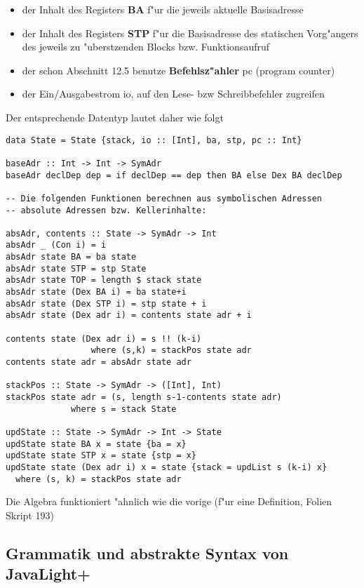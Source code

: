 \documentclass[11pt]{article}
\begin{document}
\begin{itemize}
\item der Inhalt des Registers \textbf{BA} f"ur die jeweils aktuelle Basisadresse
\item der Inhalt des Registers \textbf{STP} f"ur die Basisadresse des statischen Vorg"angers des jeweils zu "uberstzenden Blocks bzw. Funktionsaufruf
\item der schon Abschnitt 12.5 benutze \textbf{Befehlsz"ahler} pc (program counter)
\item der Ein/Ausgabestrom io, auf den Lese- bzw Schreibbefehler zugreifen
\end{itemize}

Der entsprechende Datentyp lautet daher wie folgt

\begin{verbatim}
data State = State {stack, io :: [Int], ba, stp, pc :: Int}

baseAdr :: Int -> Int -> SymAdr
baseAdr declDep dep = if declDep == dep then BA else Dex BA declDep

-- Die folgenden Funktionen berechnen aus symbolischen Adressen
-- absolute Adressen bzw. Kellerinhalte:

absAdr, contents :: State -> SymAdr -> Int
absAdr _ (Con i) = i
absAdr state BA = ba state
absAdr state STP = stp State
absAdr state TOP = length $ stack state
absAdr state (Dex BA i) = ba state+i
absAdr state (Dex STP i) = stp state + i
absAdr state (Dex adr i) = contents state adr + i

contents state (Dex adr i) = s !! (k-i)
			     where (s,k) = stackPos state adr
contents state adr = absAdr state adr

stackPos :: State -> SymAdr -> ([Int], Int)
stackPos state adr = (s, length s-1-contents state adr)
		     where s = stack State

updState :: State -> SymAdr -> Int -> State
updState state BA x = state {ba = x}
updState state STP x = state {stp = x}
updState state (Dex adr i) x = state {stack = updList s (k-i) x}
  where (s, k) = stackPos state adr
\end{verbatim}


Die Algebra funktioniert "ahnlich wie die vorige (f"ur eine Definition, Folien Skript 193)

\subsection{Grammatik und abstrakte Syntax von JavaLight+}
\label{sec-13-2}
\end{document}
